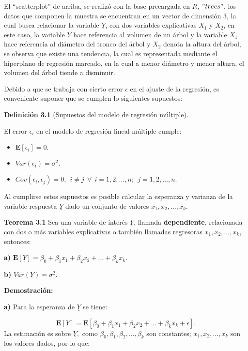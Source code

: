 \documentclass[
  a4paper,
  oneside,
  openany]{book}
\begin{document}
El ``scatterplot'' de arriba, se realizó con la base precargada en \(R\), \("trees"\), los datos que componen la muestra se encuentran en un vector de dimensión 3, la cual busca relacionar la variable \(\underline{Y}\), con dos variables explicativas \(X_{1}\) y \(X_{2}\), en este caso, la variable \(\underline{Y}\) hace referencia al volumen de un árbol y la variable \(X_{1}\) hace referencia al diámetro del tronco del árbol y \(X_{2}\) denota la altura del árbol, se observa que existe una tendencia, la cual es representada mediante el hiperplano de regresión marcado, en la cual a menor diámetro y menor altura, el volumen del árbol tiende a disminuir.

Debido a que se trabaja con cierto error \(\epsilon\) en el ajuste de la regresión, es conveniente suponer que se cumplen lo siguientes supuestos:

\textbf{Definición 3.1} (Supuestos del modelo de regresión múltiple).

El error \(\epsilon_{i}\) en el modelo de regresión lineal múltiple cumple:

\begin{itemize}
\item
  \(\mathbf{E}[\epsilon_{i}]=0.\)
\item
  \(Var(\epsilon_{i})=\sigma^2.\)
\item
  \(Cov(\epsilon_{i},\epsilon_{j})=0, \ \ i \neq j \ \ \forall \ \ i= 1,2,\ldots,n; \ \ j= 1,2,\ldots,n.\)
\end{itemize}

Al cumplirse estos supuestos es posible calcular la esperanza y varianza de la variable respuesta \(\underline{Y}\) dado un conjunto de valores \(x_{1},x_{2},\ldots,x_{k}.\)

\textbf{Teorema 3.1} Sea una variable de interés \(\underline{Y}\), llamada \textbf{dependiente}, relacionada con dos o más variables explicativas o también llamadas regresoras \(x_{1},x_{2},\ldots,x_{k}\),
entonces:

\textbf{a)} \(\mathbf{E}[\underline{Y}]= \beta_{0}+\beta_{1}x_{1}+\beta_{2}x_{2}+ \ldots + \beta_{k}x_{k}.\)

\textbf{b)} \(Var(\underline{Y})= \sigma^2.\)

\textbf{Demostración:}

\textbf{a)} Para la esperanza de \(\underline{Y}\) se tiene:

\[\mathbf{E}[\underline{Y}]=\mathbf{E}[\beta_{0}+\beta_{1}x_{1}+\beta_{2}x_{2}+ \ldots +\beta_{k}x_{k}+\epsilon].\]
La estimación es sobre \(\underline{Y},\)
como \(\beta_{0},\beta_{1},\beta_{2},\ldots,\beta_{k}\) son constantes; \(x_{1},x_{2}, \ldots,x_{k}\) son los valores dados, por lo que:
\end{document}
